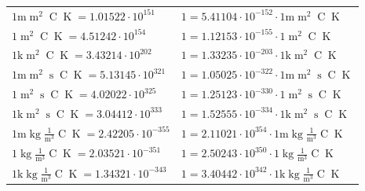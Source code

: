\begin{center}
\begin{longtable}{l l}
{\color{gray}$1 \bm{\mathrm{ m}}{\operatorname{m}^2}{}{\operatorname{C}}{\operatorname{K}} = 1.01522\cdot10^{151} $}   & {\color{gray}$ 1 = 5.41104\cdot10^{-152} \cdot 1 \bm{\mathrm{ m}}{\operatorname{m}^2}{}{\operatorname{C}}{\operatorname{K}}$}  \\
{\color{black}$1 \bm{\mathrm{ }}{\operatorname{m}^2}{}{\operatorname{C}}{\operatorname{K}} = 4.51242\cdot10^{154} $}   & {\color{black}$ 1 = 1.12153\cdot10^{-155} \cdot 1 \bm{\mathrm{ }}{\operatorname{m}^2}{}{\operatorname{C}}{\operatorname{K}}$}  \\
{\color{gray}$1 \bm{\mathrm{ k}}{\operatorname{m}^2}{}{\operatorname{C}}{\operatorname{K}} = 3.43214\cdot10^{202} $}   & {\color{gray}$ 1 = 1.33235\cdot10^{-203} \cdot 1 \bm{\mathrm{ k}}{\operatorname{m}^2}{}{\operatorname{C}}{\operatorname{K}}$}  \\
{\color{gray}$1 \bm{\mathrm{ m}}{\operatorname{m}^2}{\operatorname{s}}{\operatorname{C}}{\operatorname{K}} = 5.13145\cdot10^{321} $}   & {\color{gray}$ 1 = 1.05025\cdot10^{-322} \cdot 1 \bm{\mathrm{ m}}{\operatorname{m}^2}{\operatorname{s}}{\operatorname{C}}{\operatorname{K}}$}  \\
{\color{black}$1 \bm{\mathrm{ }}{\operatorname{m}^2}{\operatorname{s}}{\operatorname{C}}{\operatorname{K}} = 4.02022\cdot10^{325} $}   & {\color{black}$ 1 = 1.25123\cdot10^{-330} \cdot 1 \bm{\mathrm{ }}{\operatorname{m}^2}{\operatorname{s}}{\operatorname{C}}{\operatorname{K}}$}  \\
{\color{gray}$1 \bm{\mathrm{ k}}{\operatorname{m}^2}{\operatorname{s}}{\operatorname{C}}{\operatorname{K}} = 3.04412\cdot10^{333} $}   & {\color{gray}$ 1 = 1.52555\cdot10^{-334} \cdot 1 \bm{\mathrm{ k}}{\operatorname{m}^2}{\operatorname{s}}{\operatorname{C}}{\operatorname{K}}$}  \\
\hline{\color{gray}$1 \bm{\mathrm{ m}}\operatorname{kg}\frac1{\operatorname{m}^3}{}{\operatorname{C}}{\operatorname{K}} = 2.42205\cdot10^{-355} $}   & {\color{gray}$ 1 = 2.11021\cdot10^{354} \cdot 1 \bm{\mathrm{ m}}\operatorname{kg}\frac1{\operatorname{m}^3}{}{\operatorname{C}}{\operatorname{K}}$}  \\
{\color{black}$1 \bm{\mathrm{ }}\operatorname{kg}\frac1{\operatorname{m}^3}{}{\operatorname{C}}{\operatorname{K}} = 2.03521\cdot10^{-351} $}   & {\color{black}$ 1 = 2.50243\cdot10^{350} \cdot 1 \bm{\mathrm{ }}\operatorname{kg}\frac1{\operatorname{m}^3}{}{\operatorname{C}}{\operatorname{K}}$}  \\
{\color{gray}$1 \bm{\mathrm{ k}}\operatorname{kg}\frac1{\operatorname{m}^3}{}{\operatorname{C}}{\operatorname{K}} = 1.34321\cdot10^{-343} $}   & {\color{gray}$ 1 = 3.40442\cdot10^{342} \cdot 1 \bm{\mathrm{ k}}\operatorname{kg}\frac1{\operatorname{m}^3}{}{\operatorname{C}}{\operatorname{K}}$}  \\

\end{longtable}
\end{center}

